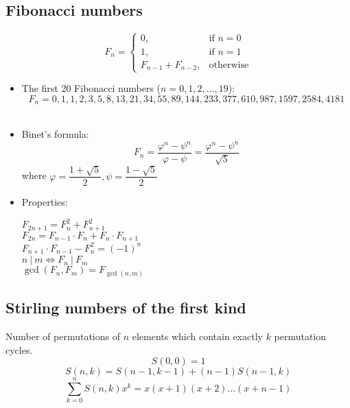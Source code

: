 \subsection{Fibonacci numbers}
\[ F_{n} =
  \begin{cases}
    0, & \text{if } n = 0 \\
    1, & \text{if } n = 1 \\
    F_{n - 1} + F_{n - 2}, & \text{otherwise}
  \end{cases}
\]
\begin{itemize}
  \item The first 20 Fibonacci numbers ($n = 0, 1, 2, \ldots, 19$):
    \[ F_n = 0, 1, 1, 2, 3, 5, 8, 13, 21, 34, 55, 89, 144, 233, 377, 610, 987, 1597, 2584, 4181 \]\
  \item Binet's formula:
    \[F_n = \frac{\varphi^n - \psi^n}{\varphi - \psi} = \frac{\varphi^n - \psi^n}{\sqrt{5}}\]
    where $\varphi = \dfrac{1 + \sqrt{5}}{2}, \psi = \dfrac{1 - \sqrt{5}}{2}$
  \item Properties:
  \begin{multicols*}{2}
    $F_{2n + 1} = F_{n}^2 + F_{n + 1}^2$ \\
    $F_{2n} = F_{n - 1} \cdot F_{n} + F_{n} \cdot F_{n + 1}$ \\
    $F_{n + 1} \cdot F_{n - 1} - F_{n}^2 = (-1)^{n}$ \\
    $n\ |\ m \Leftrightarrow F_{n}\ |\ F_{m}$ \\
    $\gcd(F_{n}, F_{m}) = F_{\gcd(n, m)}$
  \end{multicols*}
\end{itemize}

\subsection{Stirling numbers of the first kind}
Number of permutations of $n$ elements which contain exactly $k$ permutation cycles.
\[S(0, 0) = 1\]
\[S(n, k) = S(n - 1, k - 1) + (n - 1)S(n - 1, k)\]
\[\sum\limits_{k = 0}^{n}{S(n, k)x^k = x(x + 1)(x + 2)\ldots(x + n - 1)}\]

